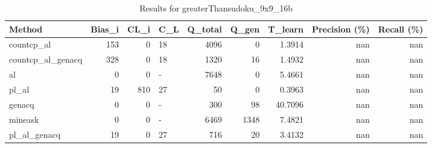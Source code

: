 \begin{table}[ht]
\caption{Results for greaterThansudoku_9x9_16b}
\begin{tabular}{lrrlrrrrr}
\hline
 Method            &   Bias\_i &   CL\_i & C\_L   &   Q\_total &   Q\_gen &   T\_learn &   Precision (\%) &   Recall (\%) \\
\hline
 countcp\_al        &      153 &      0 & 18    &      4096 &       0 &    1.3914 &             nan &          nan \\
 countcp\_al\_genacq &      328 &      0 & 18    &      1320 &      16 &    1.4932 &             nan &          nan \\
 al                &        0 &      0 & -     &      7648 &       0 &    5.4661 &             nan &          nan \\
 pl\_al             &       19 &    810 & 27    &        50 &       0 &    0.3963 &             nan &          nan \\
 genacq            &        0 &      0 & -     &       300 &      98 &   40.7096 &             nan &          nan \\
 mineask           &        0 &      0 & -     &      6469 &    1348 &    7.4821 &             nan &          nan \\
 pl\_al\_genacq      &       19 &      0 & 27    &       716 &      20 &    3.4132 &             nan &          nan \\
\hline
\end{tabular}
\end{table}